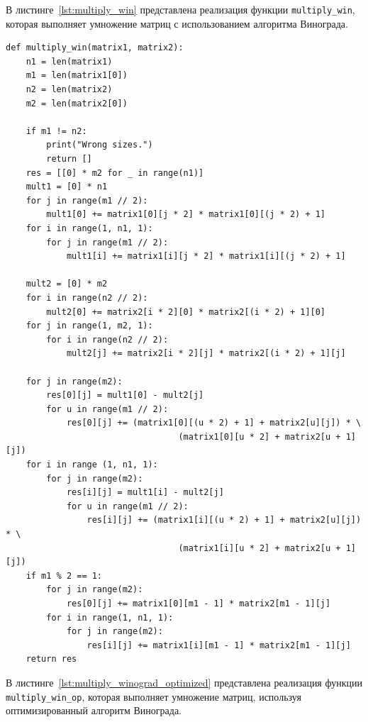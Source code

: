 \documentclass[a4paper, 12pt]{extreport}
\begin{document}
В листинге~\ref{lst:multiply_win} представлена реализация функции \texttt{multiply\_win}, которая выполняет умножение матриц с использованием алгоритма Винограда.
\begin{center}
\captionsetup{justification=raggedright,singlelinecheck=off}
\begin{lstlisting}
def multiply_win(matrix1, matrix2):
    n1 = len(matrix1)
    m1 = len(matrix1[0])
    n2 = len(matrix2)
    m2 = len(matrix2[0])

    if m1 != n2:
        print("Wrong sizes.")
        return []
    res = [[0] * m2 for _ in range(n1)]
    mult1 = [0] * n1
    for j in range(m1 // 2):
        mult1[0] += matrix1[0][j * 2] * matrix1[0][(j * 2) + 1]
    for i in range(1, n1, 1):
        for j in range(m1 // 2):
            mult1[i] += matrix1[i][j * 2] * matrix1[i][(j * 2) + 1]

    mult2 = [0] * m2
    for i in range(n2 // 2):
        mult2[0] += matrix2[i * 2][0] * matrix2[(i * 2) + 1][0]
    for j in range(1, m2, 1):
        for i in range(n2 // 2):
            mult2[j] += matrix2[i * 2][j] * matrix2[(i * 2) + 1][j]

    for j in range(m2):
        res[0][j] = mult1[0] - mult2[j]
        for u in range(m1 // 2):
            res[0][j] += (matrix1[0][(u * 2) + 1] + matrix2[u][j]) * \
                                  (matrix1[0][u * 2] + matrix2[u + 1][j])
    for i in range (1, n1, 1):
        for j in range(m2):
            res[i][j] = mult1[i] - mult2[j]
            for u in range(m1 // 2):
                res[i][j] += (matrix1[i][(u * 2) + 1] + matrix2[u][j]) * \
                                  (matrix1[i][u * 2] + matrix2[u + 1][j])
    if m1 % 2 == 1:
        for j in range(m2):
            res[0][j] += matrix1[0][m1 - 1] * matrix2[m1 - 1][j]
        for i in range(1, n1, 1):
            for j in range(m2):
                res[i][j] += matrix1[i][m1 - 1] * matrix2[m1 - 1][j]
    return res
\end{lstlisting}
\captionsetup{justification=centering, singlelinecheck=off}
\label{lst:multiply_win}
\end{center}


В листинге~\ref{lst:multiply_winograd_optimized} представлена реализация функции \texttt{multiply\_win\_op}, которая выполняет умножение матриц, используя оптимизированный алгоритм Винограда.
\end{document}
